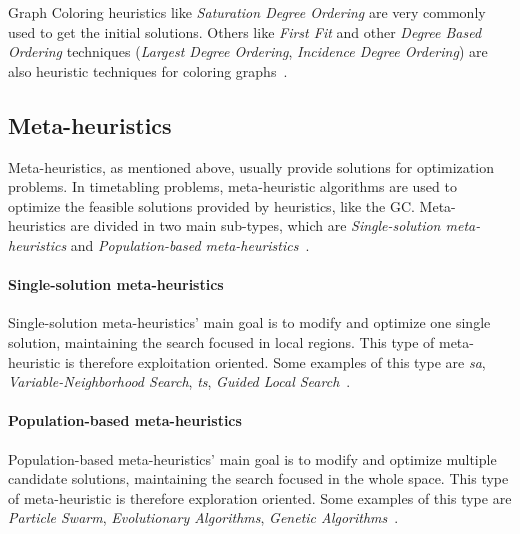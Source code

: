 Graph Coloring heuristics like \textit{Saturation Degree Ordering} are very commonly used to get the initial solutions. Others like \textit{First Fit} and other \textit{Degree Based Ordering} techniques (\textit{Largest Degree Ordering}, \textit{Incidence Degree Ordering}) are also heuristic techniques for coloring graphs~\cite{Lee1996}.\\


\subsection{Meta-heuristics}
Meta-heuristics, as mentioned above, usually provide solutions for optimization problems. In timetabling problems, meta-heuristic algorithms are used to optimize the feasible solutions provided by heuristics, like the GC. Meta-heuristics are divided in two main sub-types, which are \textit{Single-solution meta-heuristics} and \textit{Population-based meta-heuristics}~\cite{Talbi2009}.\\

\paragraph{Single-solution meta-heuristics}
Single-solution meta-heuristics' main goal is to modify and optimize one single solution, maintaining the search focused in local regions. This type of meta-heuristic is therefore exploitation oriented. Some examples of this type are \textit{\gls{sa}}, \textit{Variable-Neighborhood Search}, \textit{\gls{ts}}, \textit{Guided Local Search}~\cite{Talbi2009}. \\

\paragraph{Population-based meta-heuristics}
Population-based meta-heuristics' main goal is to modify and optimize multiple candidate solutions, maintaining the search focused in the whole space. This type of meta-heuristic is therefore exploration oriented. Some examples of this type are \textit{Particle Swarm}, \textit{Evolutionary Algorithms}, \textit{Genetic Algorithms}~\cite{Talbi2009}.\\

